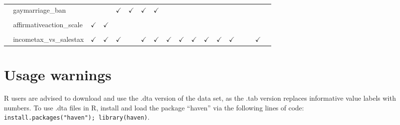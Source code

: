 \documentclass[
  12pt]{article}
\begin{document}
\begin{table}[H]
{\begin{tabular}{lcccccccccccccccc}
$\hspace{10pt}$gaymarriage\_ban &  &  & $\checkmark$ & $\checkmark$ & $\checkmark$ & $\checkmark$ &  &  &  &  &  &  &  &  &  & \\
\cellcolor{gray!6}{$\hspace{10pt}$gaymarriage\_legalize} & \cellcolor{gray!6}{} & \cellcolor{gray!6}{} & \cellcolor{gray!6}{} & \cellcolor{gray!6}{} & \cellcolor{gray!6}{} & \cellcolor{gray!6}{} & \cellcolor{gray!6}{$\checkmark$} & \cellcolor{gray!6}{$\checkmark$} & \cellcolor{gray!6}{$\checkmark$} & \cellcolor{gray!6}{$\checkmark$} & \cellcolor{gray!6}{$\checkmark$} & \cellcolor{gray!6}{} & \cellcolor{gray!6}{} & \cellcolor{gray!6}{} & \cellcolor{gray!6}{} & \cellcolor{gray!6}{}\\
$\hspace{10pt}$affirmativeaction\_scale & $\checkmark$ & $\checkmark$ &  &  &  &  &  &  &  &  &  &  &  &  &  & \\
\cellcolor{gray!6}{$\hspace{10pt}$affirmativeaction} & \cellcolor{gray!6}{} & \cellcolor{gray!6}{} & \cellcolor{gray!6}{$\checkmark$} & \cellcolor{gray!6}{$\checkmark$} & \cellcolor{gray!6}{$\checkmark$} & \cellcolor{gray!6}{$\checkmark$} & \cellcolor{gray!6}{$\checkmark$} & \cellcolor{gray!6}{$\checkmark$} & \cellcolor{gray!6}{$\checkmark$} & \cellcolor{gray!6}{} & \cellcolor{gray!6}{} & \cellcolor{gray!6}{} & \cellcolor{gray!6}{} & \cellcolor{gray!6}{} & \cellcolor{gray!6}{} & \cellcolor{gray!6}{}\\
$\hspace{10pt}$incometax\_vs\_salestax & $\checkmark$ & $\checkmark$ & $\checkmark$ &  & $\checkmark$ & $\checkmark$ & $\checkmark$ & $\checkmark$ & $\checkmark$ & $\checkmark$ & $\checkmark$ & $\checkmark$ &  &  & $\checkmark$ & \\
\bottomrule
\end{tabular}}
\end{table}

\newpage

\hypertarget{usage-warnings}{%
\section{Usage warnings}\label{usage-warnings}}

R users are advised to download and use the .dta version of the data
set, as the .tab version replaces informative value labels with numbers.
To use .dta files in R, install and load the package ``haven'' via the
following lines of code:
\texttt{install.packages("haven");\ library(haven)}.
\end{document}

